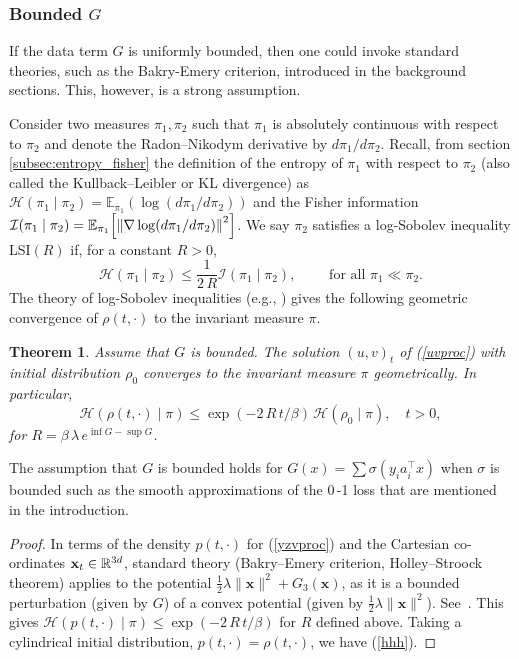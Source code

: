 \documentclass[11pt, twoside]{report}
\newtheorem{theorem}{Theorem}[section]
\renewcommand{\vec}[1]{{\mathbf{#1}}}
\begin{document}
\subsubsection{Bounded \texorpdfstring{$G$}{G}}
If the data term $G$ is uniformly bounded, then one could invoke standard theories, such as the Bakry-Emery criterion, introduced in the background sections. This, however, is a strong assumption.

Consider two measures $\pi_1,\pi_2$ such that $\pi_1$ is absolutely continuous with respect to $\pi_2$ and denote the Radon--Nikodym derivative by $d\pi_1/d\pi_2$. Recall, from section \ref{subsec:entropy_fisher} the definition of the entropy of $\pi_1$ with respect to $\pi_2$ (also called the Kullback--Leibler or KL divergence) as $\mathcal H(\pi_1\mid \pi_2)=\mathbb{E}_{\pi_1}(\log(d\pi_1/d\pi_2))$ and the Fisher information $\mathcal I(\pi_1\mid \pi_2)=\mathbb{E}_{\pi_1}\bp{\norm{\nabla \log(d\pi_1/d\pi_2)}^2}$. We say $\pi_2$ satisfies a log-Sobolev inequality LSI$(R)$ if, for a constant $R>0$,
\[\mathcal{H}(\pi_1\mid \pi_2)\le\frac{1}{2\,R} \mathcal{I}(\pi_1\mid \pi_2),\qquad \text{ for all } \pi_1\ll \pi_2. 
\]
The theory of log-Sobolev inequalities (e.g., \cite{Lelievre2016-hx}) gives the following geometric convergence of $\rho(t,\cdot)$ to the invariant measure $\pi$. 
\begin{theorem} \label{thm_bndd_G} Assume that $G$ is bounded.
    The solution $(u,v)_t$ of (\ref{uvproc}) with initial distribution $\rho_0$ converges to the invariant measure $\pi$ geometrically. In particular, 
    \begin{equation}\mathcal H(\rho(t,\cdot) \mid \pi)\le \exp(-2\,R\,t/\beta)\, \mathcal H(\rho_0 \mid \pi),\quad t>0,
    \label{hhh}\end{equation}
    for $R=\beta\, \lambda\,e^{\inf G-\sup G}$.
\end{theorem}
The assumption that $G$ is bounded holds for  $G(x)=\sum \sigma(y_i a_i^\top x)$ when $\sigma$ is bounded such as the smooth approximations of the 0\,-1 loss that are mentioned in the introduction.
\begin{proof}
 In terms of the density $p(t,\cdot)$ for (\ref{yzvproc}) and the Cartesian co-ordinates $\vec x_t\in \real^{3d}$, standard theory (Bakry--Emery criterion, Holley--Stroock theorem) applies to the potential $\frac 12 \lambda \|\vec x \|^2+G_3(\vec x)$, as it is a bounded perturbation (given by $G$) of a convex potential (given by $\frac12\lambda\|\vec x\|^2$).
 See~\cite[Proposition 2.9]{Lelievre2016-hx}. This gives $\mathcal H(p(t,\cdot) \mid \pi)\le \exp(-2\,R\,t/\beta)$ for $R$ defined above. Taking a cylindrical initial distribution, $p(t,\cdot)=\rho(t,\cdot)$, we have (\ref{hhh}).
\end{proof}
\end{document}
